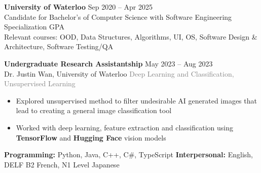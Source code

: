 \documentclass[9pt]{developercv} %
\begin{document}


\begin{minipage}[t]{\textwidth}
	\vspace{-\baselineskip}
	\textbf{University of Waterloo} \hfill Sep 2020 -- Apr 2025 \\
	Candidate for Bachelor's of Computer Science with Software Engineering Specialization  GPA \\
	Relevant courses: OOD, Data Structures, Algorithms, UI, OS, Software Design \& Architecture, Software Testing/QA
\end{minipage}


\begin{minipage}[t]{\textwidth}
	\vspace{-\baselineskip}
	\textbf{Undergraduate Research Assistantship} \hfill May 2023 -- Aug 2023\\
	Dr. Justin Wan, \; University of Waterloo \hfill \textcolor{gray}{Deep Learning and Classification, Unsupervised Learning}
	\begin{itemize}[noitemsep,topsep=0pt]
		\item Explored unsupervised method to filter undesirable AI generated images that lead to creating a general image classification tool
		\item Worked with deep learning, feature extraction and classification using \textbf{TensorFlow} and \textbf{Hugging Face} vision models
	\end{itemize}
\end{minipage}


\begin{minipage}[t]{\textwidth}
	\vspace{-\baselineskip}
	\textbf{Programming:} Python, Java, C++, C\#, TypeScript
	\hfill
	\textbf{Interpersonal:} English, DELF B2 French, N1 Level Japanese
\end{minipage}


\end{document}
